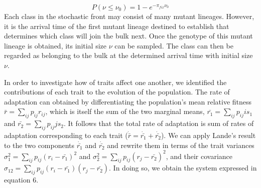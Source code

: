 \documentclass[11pt,twocolumn]{article}
\begin{document}
% 
% 
% 
% 
% 
\begin{equation} \label{eq:4}
P(\nu \leq \nu_0) = 1- e^{-\pi_{fix} \nu_0}
\end{equation}
Each class in the stochastic front may consist of many mutant lineages. However, it is the arrival time of the first mutant lineage destined to establish that determines which class will join the bulk next. Once the genotype of this mutant lineage is obtained, its initial size $\nu$ can be sampled. The class can then be regarded as belonging to the bulk at the determined arrival time with initial size $\nu$. \par
% 
% 
% 
% 
% 
In order to investigate how of traits affect one another, we identified the contributions of each trait to the evolution of the population. The rate of adaptation can obtained by differentiating the population's mean relative fitness $\bar{r}=\sum_{ij} p_{ij} r_{ij}$, which is itself the sum of the two marginal means, $\bar{r_1}=\sum_{ij} p_{ij} is_1$ and $\bar{r_2}=\sum_{ij} p_{ij} j s_2$.  It follows that the total rate of adaptation is sum of rates of adaptation corresponding to each trait ($\dot{\bar{r}}=\dot{\bar{r_1}} +\dot{\bar{r_2}}$).  We can apply Lande's result to the two components $\dot{\bar{r_1}} $ and $\dot{\bar{r_2}} $ and rewrite them in terms of the trait variances $\sigma_1^2 = \sum_{ij} p_{ij} (r_i-\bar{r_1})^2$ and $\sigma_2^2 = \sum_{ij} p_{ij} (r_j-\bar{r_2})^2$, and their covariance $\sigma_{12} =\sum_{ij} p_{ij} (r_i-\bar{r_1})(r_j-\bar{r_2})$.  In doing so, we obtain the system expressed in equation 6.
\end{document}
